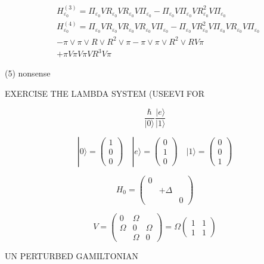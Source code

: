$$\begin{aligned}
& H_{\varepsilon_{0}}^{(3)}=\Pi_{\varepsilon_{0}} V R_{\varepsilon_{0}} V R_{\varepsilon_{0}} V \Pi_{\varepsilon_{0}}-\Pi_{\varepsilon_{0}} V \Pi_{\varepsilon_{0}} V R_{\varepsilon_{0}}^{2} V \Pi_{\varepsilon_{0}} \\
& H_{\varepsilon_{0}}^{(4)}=\Pi_{\varepsilon_{0}} V R_{\varepsilon_{0}} V R_{\varepsilon_{0}} V R_{\varepsilon_{0}} V \Pi_{\varepsilon_{0}}-\Pi_{\varepsilon_{0}} V R_{\varepsilon_{0}}^{2} V \Pi_{\varepsilon_{0}} V R_{\varepsilon_{0}} V \Pi_{\varepsilon_{0}} \\
& -\pi \vee \pi \vee R \vee R^{2} \vee \pi-\pi \vee \pi \vee R^{2} \vee R V \pi \\
& +\pi V \pi V \pi V R^{3} V \pi
\end{aligned}
$$

(5) nonsense

EXERCISE THE LAMBDA SYSTEM (USEEVI FOR

$$
\frac{\hbar}{|0\rangle} \frac{|e\rangle}{|1\rangle}
$$

$$
|0\rangle=\left(\begin{array}{l}
1 \\ 0 \\ 0
\end{array}\right) \quad |e\rangle=\left(\begin{array}{l}
0 \\ 1 \\ 0
\end{array}\right) \quad |1\rangle=\left(\begin{array}{l}
0 \\ 0 \\ 1
\end{array}\right)
$$

$$
H_{0}=\left(\begin{array}{ccc}
0 & & \\ & +\Delta & \\ & & 0
\end{array}\right)
$$

$$
V=\left(\begin{array}{ccc}
0 & \Omega & \\ \Omega & 0 & \Omega \\ & \Omega & 0
\end{array}\right)=\Omega\left(\begin{array}{ll}1 & 1 \\ 1 & 1\end{array}\right)
$$

UN PERTURBED
GAMILTONIAN

